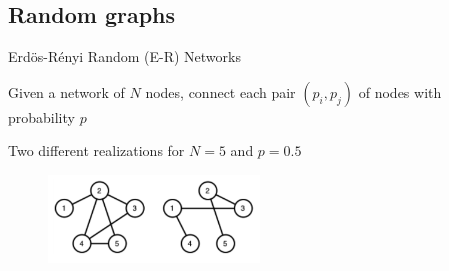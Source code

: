\subsection{Random graphs}

\begin{frame}{Erd\"{o}s-R\'{e}nyi Random (E-R) Networks}

\begin{definition}
Given a network of $N$ nodes, connect each pair $(p_i,p_j)$ of nodes
with probability $p$
\end{definition}

\bigskip
Two different realizations for $N = 5$ and $p = 0.5$

\begin{figure}
\includegraphics[width=0.5\textwidth]{random}
\end{figure}

\end{frame}

